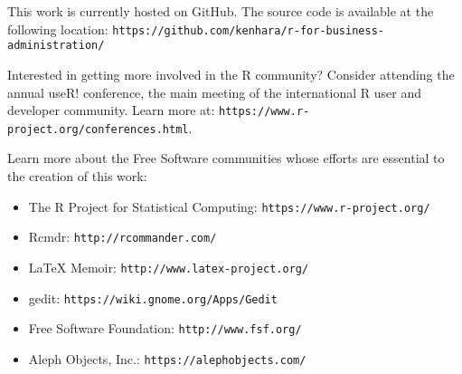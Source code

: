 %
%
%
%
%

\setlength{\parindent}{0pt}
This work is currently hosted on GitHub. The source code is available at the following location: \texttt{https://github.com/kenhara/r-for-business-administration/}

Interested in getting more involved in the R community? Consider attending the annual useR! conference, the main meeting of the international R user and developer community. Learn more at: \texttt{https://www.r-project.org/conferences.html}.

Learn more about the Free Software communities whose efforts are essential to the creation of this work:

\begin{itemize}
 \item The R Project for Statistical Computing: \texttt{https://www.r-project.org/}
 \item Rcmdr: \texttt{http://rcommander.com/}
 \item {\LaTeX} Memoir: \texttt{http://www.latex-project.org/}
 \item gedit: \texttt{https://wiki.gnome.org/Apps/Gedit}
 \item Free Software Foundation: \texttt{http://www.fsf.org/}
 \item Aleph Objects, Inc.: \texttt{https://alephobjects.com/}
\end{itemize}